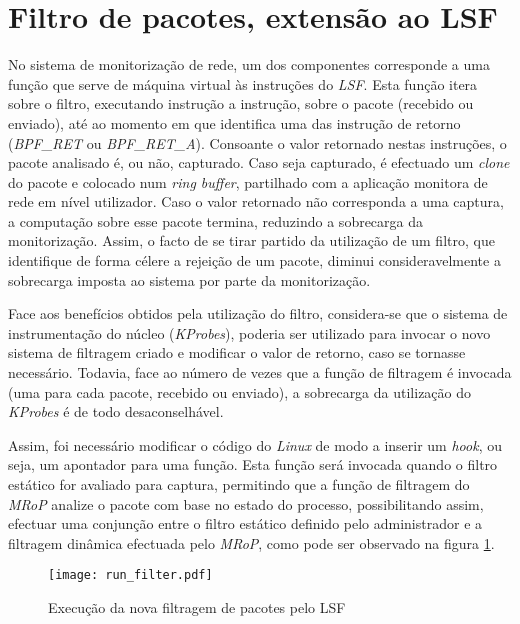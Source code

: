 
\section{Filtro de pacotes, extensão ao LSF}

No sistema de monitorização de rede, um dos componentes corresponde a uma função que serve de máquina virtual às instruções do \textit{LSF}.
Esta função itera sobre o filtro, executando instrução a instrução, sobre o pacote (recebido ou enviado), até ao momento em que identifica uma das instrução de retorno (\textit{BPF\_RET} ou \textit{BPF\_RET\_A}).
Consoante o valor retornado nestas instruções, o pacote analisado é, ou não, capturado.
Caso seja capturado, é efectuado um \textit{clone} do pacote e colocado num \textit{ring buffer}, partilhado com a aplicação monitora de rede em nível utilizador.
Caso o valor retornado não corresponda a uma captura, a computação sobre esse pacote termina, reduzindo a sobrecarga da monitorização.
Assim, o facto de se tirar partido da utilização de um filtro, que identifique de forma célere a rejeição de um pacote, diminui consideravelmente a sobrecarga imposta ao sistema por parte da monitorização.

Face aos benefícios obtidos pela utilização do filtro, considera-se que o sistema de instrumentação do núcleo (\textit{KProbes}), poderia ser utilizado para invocar o novo sistema de filtragem criado e modificar o valor de retorno, caso se tornasse necessário.
Todavia, face ao número de vezes que a função de filtragem é invocada (uma para cada pacote, recebido ou enviado), a sobrecarga da utilização do \textit{KProbes} é de todo desaconselhável.

Assim, foi necessário modificar o código do \textit{Linux} de modo a inserir um \textit{hook}, ou seja, um apontador para uma função.
Esta função será invocada quando o filtro estático for avaliado para captura, permitindo que a função de filtragem do \textit{MRoP} analize o pacote com base no estado do processo, possibilitando assim, efectuar uma conjunção entre o filtro estático definido pelo administrador e a filtragem dinâmica efectuada pelo \textit{MRoP}, como pode ser observado na figura \ref{fig:run_filter}.

\begin{figure}[!ht]
\centering
\texttt{[image: run\_filter.pdf]}
\caption{Execução da nova filtragem de pacotes pelo LSF}
\label{fig:run_filter}
\end{figure}

